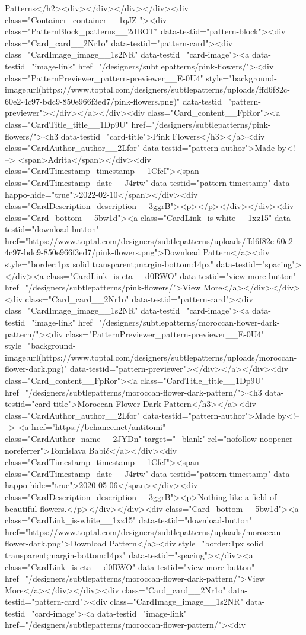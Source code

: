 Patterns</h2><div></div></div></div><div class="Container_container__1qJZ-"><div class="PatternBlock_patterns__2dBOT" data-testid="pattern-block"><div class="Card_card__2Nr1o" data-testid="pattern-card"><div class="CardImage_image__1s2NR" data-testid="card-image"><a data-testid="image-link" href="/designers/subtlepatterns/pink-flowers/"><div class="PatternPreviewer_pattern-previewer__E-0U4" style="background-image:url(https://www.toptal.com/designers/subtlepatterns/uploads/ffd6f82c-60e2-4c97-bdc9-850e966f3ed7/pink-flowers.png)" data-testid="pattern-previewer"></div></a></div><div class="Card_content__FpRor"><a class="CardTitle_title__1Dp9U" href="/designers/subtlepatterns/pink-flowers/"><h3 data-testid="card-title">Pink Flowers</h3></a><div class="CardAuthor_author__2Lfor" data-testid="pattern-author">Made by<!-- --> <span>Adrita</span></div><div class="CardTimestamp_timestamp__1CfcI"><span class="CardTimestamp_date__J4rtw" data-testid="pattern-timestamp" data-happo-hide="true">2022-02-10</span></div><div class="CardDescription_description__3ggrB"><p></p></div></div><div class="Card_bottom__5bw1d"><a class="CardLink_is-white__1xz15" data-testid="download-button" href="https://www.toptal.com/designers/subtlepatterns/uploads/ffd6f82c-60e2-4c97-bdc9-850e966f3ed7/pink-flowers.png">Download Pattern</a><div style="border:1px solid transparent;margin-bottom:14px" data-testid="spacing"></div><a class="CardLink_is-cta__d0RWO" data-testid="view-more-button" href="/designers/subtlepatterns/pink-flowers/">View More</a></div></div><div class="Card_card__2Nr1o" data-testid="pattern-card"><div class="CardImage_image__1s2NR" data-testid="card-image"><a data-testid="image-link" href="/designers/subtlepatterns/moroccan-flower-dark-pattern/"><div class="PatternPreviewer_pattern-previewer__E-0U4" style="background-image:url(https://www.toptal.com/designers/subtlepatterns/uploads/moroccan-flower-dark.png)" data-testid="pattern-previewer"></div></a></div><div class="Card_content__FpRor"><a class="CardTitle_title__1Dp9U" href="/designers/subtlepatterns/moroccan-flower-dark-pattern/"><h3 data-testid="card-title">Moroccan Flower Dark Pattern</h3></a><div class="CardAuthor_author__2Lfor" data-testid="pattern-author">Made by<!-- --> <a href="https://behance.net/antitomi" class="CardAuthor_name__2JYDn" target="_blank" rel="nofollow noopener noreferrer">Tomislava Babić</a></div><div class="CardTimestamp_timestamp__1CfcI"><span class="CardTimestamp_date__J4rtw" data-testid="pattern-timestamp" data-happo-hide="true">2020-05-06</span></div><div class="CardDescription_description__3ggrB"><p>Nothing like a field of beautiful flowers.</p></div></div><div class="Card_bottom__5bw1d"><a class="CardLink_is-white__1xz15" data-testid="download-button" href="https://www.toptal.com/designers/subtlepatterns/uploads/moroccan-flower-dark.png">Download Pattern</a><div style="border:1px solid transparent;margin-bottom:14px" data-testid="spacing"></div><a class="CardLink_is-cta__d0RWO" data-testid="view-more-button" href="/designers/subtlepatterns/moroccan-flower-dark-pattern/">View More</a></div></div><div class="Card_card__2Nr1o" data-testid="pattern-card"><div class="CardImage_image__1s2NR" data-testid="card-image"><a data-testid="image-link" href="/designers/subtlepatterns/moroccan-flower-pattern/"><div 